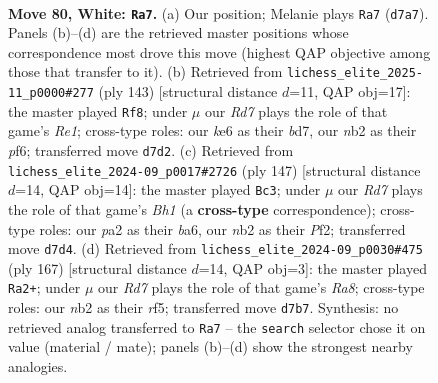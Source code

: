 \documentclass[11pt]{article}
\begin{document}
\clearpage

\begin{figure}[p]\centering
\begin{subfigure}{0.46\textwidth}\centering
\resizebox{\linewidth}{!}{%
\newchessgame
\chessboard[
  setfen={8/3R4/4k1pP/5p2/5P2/8/pn4K1/8 w - - 2 80},
  showmover=false,
  pgfstyle=straightmove, color=movearrow, markmove={d7-a7}
]}
\caption{}
\end{subfigure}\hfill
\begin{subfigure}{0.46\textwidth}\centering
\resizebox{\linewidth}{!}{%
\newchessgame
\chessboard[
  setfen={4r3/3B4/5P1p/7P/8/6P1/2kp1K2/8 b - - 2 72},
  showmover=false,
  pgfstyle=straightmove, color=movearrow, markmove={e8-f8}
]}
\caption{}
\end{subfigure}
\\[4pt]
\begin{subfigure}{0.46\textwidth}\centering
\resizebox{\linewidth}{!}{%
\newchessgame
\chessboard[
  setfen={7b/7K/B5P1/p7/P7/8/3k1p2/8 b - - 8 74},
  showmover=false,
  pgfstyle=straightmove, color=movearrow, markmove={h8-c3}
]}
\caption{}
\end{subfigure}\hfill
\begin{subfigure}{0.46\textwidth}\centering
\resizebox{\linewidth}{!}{%
\newchessgame
\chessboard[
  setfen={8/6k1/8/5R1p/7P/6P1/6K1/r7 b - - 14 84},
  showmover=false,
  pgfstyle=straightmove, color=movearrow, markmove={a1-a2}
]}
\caption{}
\end{subfigure}
\caption{\textbf{Move 80, White: \texttt{Ra7}.} (a) Our position; Melanie plays \texttt{Ra7} (\texttt{d7a7}). Panels (b)--(d) are the retrieved master positions whose correspondence most drove this move (highest QAP objective among those that transfer to it). (b) Retrieved from \texttt{lichess\_elite\_2025-11\_p0000\#277} (ply 143) [structural distance $d$=11, QAP obj=17]: the master played \texttt{Rf8}; under $\mu$ our \emph{Rd7} plays the role of that game's \emph{Re1}; cross-type roles: our \emph{k}e6 as their \emph{b}d7, our \emph{n}b2 as their \emph{p}f6; transferred move \texttt{d7d2}. (c) Retrieved from \texttt{lichess\_elite\_2024-09\_p0017\#2726} (ply 147) [structural distance $d$=14, QAP obj=14]: the master played \texttt{Bc3}; under $\mu$ our \emph{Rd7} plays the role of that game's \emph{Bh1} (a \textbf{cross-type} correspondence); cross-type roles: our \emph{p}a2 as their \emph{b}a6, our \emph{n}b2 as their \emph{P}f2; transferred move \texttt{d7d4}. (d) Retrieved from \texttt{lichess\_elite\_2024-09\_p0030\#475} (ply 167) [structural distance $d$=14, QAP obj=3]: the master played \texttt{Ra2+}; under $\mu$ our \emph{Rd7} plays the role of that game's \emph{Ra8}; cross-type roles: our \emph{n}b2 as their \emph{r}f5; transferred move \texttt{d7b7}. Synthesis: no retrieved analog transferred to \texttt{Ra7} -- the \texttt{search} selector chose it on value (material / mate); panels (b)--(d) show the strongest nearby analogies.}
\label{fig:thought-m158}
\end{figure}
\end{document}
